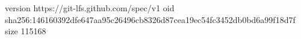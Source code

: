version https://git-lfs.github.com/spec/v1
oid sha256:146160392dfe647aa95c26496cb8326d87cea19ec54fc3452db0bd6a99f18d7f
size 115168
